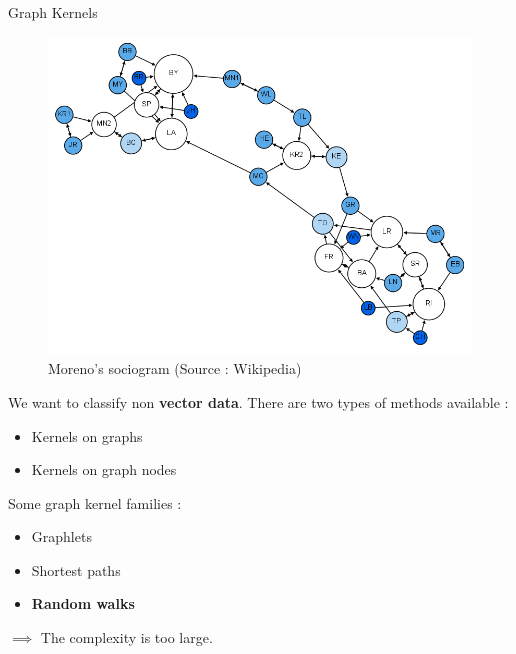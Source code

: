 \documentclass[compress]{beamer}
\begin{document}
\begin{frame}{Graph Kernels}
	\RLmulticolcolumns
	\begin{multicols}{2}
		\vspace*{\fill}
		\begin{figure}
			\includegraphics[width=0.7\linewidth]{data/sociogram.png}
			\caption*{\footnotesize Moreno's sociogram (Source : Wikipedia)}
		\end{figure}
		\vfill\null
		\columnbreak
		{We want to classify non \textbf{vector data}. There are two types of methods available :
			\begin{itemize}
				\item Kernels on graphs
				\item Kernels on graph nodes
			\end{itemize}
		\pause
		Some graph kernel families :
		\begin{itemize}
			\item Graphlets \citep{shervashidze_efficient_2009}
			\pause
			\item Shortest paths \citep{borgwardt2005shortest}
			\pause
			\item \textbf{Random walks} \citep{vishwanathan_graph_2010}
		\end{itemize}
		$\implies$ The complexity is too large.
		}
	\end{multicols}
\end{frame}
\end{document}
